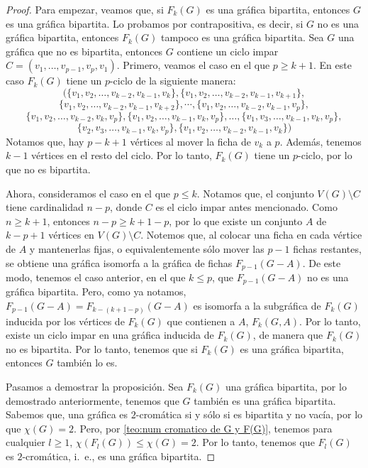 \begin{proof}
    Para empezar, veamos que, si $F_k(G)$ es una gr\'afica bipartita, entonces
    $G$ es una gr\'afica bipartita. Lo probamos por contrapositiva, es decir, si
    $G$ no es una gr\'afica bipartita, entonces $F_k(G)$ tampoco es una
    gr\'afica bipartita. Sea $G$ una gr\'afica que no es bipartita, entonces $G$
    contiene un ciclo impar $C=(v_1, \dots, v_{p-1}, v_p, v_1)$. Primero, veamos
    el caso en el que $p \geq k+1$. En este caso $F_k(G)$ tiene un $p$-ciclo de
    la siguiente manera: 
    \[
    (\{v_1, v_2, \dots, v_{k-2}, v_{k-1},v_k\},\{v_1, v_2, \dots, v_{k-2}, v_{k-1}, v_{k+1}\},\]
    \[\{v_1, v_2, \dots, v_{k-2}, v_{k-1}, v_{k+2}\},\cdots,\{v_1, v_2, \dots, v_{k-2}, v_{k-1},v_p\},\]
    \[\{v_1, v_2, \dots, v_{k-2}, v_k, v_p\},\{v_1, v_2, \dots, v_{k-1},v_k, v_p\},
    \dots,\{v_1, v_3, \dots, v_{k-1}, v_k, v_p\},\]
    \[\{v_2, v_3,\dots, v_{k-1}, v_k, v_p\},\{v_1, v_2, \dots, v_{k-2}, v_{k-1}, v_k\})
    \]
    Notamos que, hay $p-k+1$ v\'ertices al mover la ficha de $v_k$ a $p$.
    Adem\'as, tenemos $k-1$ v\'ertices en el resto del ciclo. Por lo tanto,
    $F_k(G)$ tiene un $p$-ciclo, por lo que no es bipartita.
    
    Ahora, consideramos el caso en el que $p \leq k$. Notamos que, el conjunto
    $V(G)\setminus C$ tiene cardinalidad $n-p$, donde $C$ es el ciclo impar
    antes mencionado. Como $n \geq k+1$, entonces $n-p \geq k+1-p$, por lo que
    existe un conjunto $A$ de $k-p+1$ v\'ertices en $V(G)\setminus C$. Notemos
    que, al colocar una ficha en cada v\'ertice de $A$ y mantenerlas fijas, o
    equivalentemente s\'olo mover las $p-1$ fichas restantes, se obtiene una
    gr\'afica isomorfa a la gr\'afica de fichas $F_{p-1}(G-A)$. De este modo,
    tenemos el caso anterior, en el que $k \leq p$, que $F_{p-1}(G-A)$ no es una
    gr\'afica bipartita. Pero, como ya notamos, $F_{p-1}(G-A) = F_{k-(k+1-p)}
    (G-A)$ es isomorfa a la subgr\'afica de $F_k(G)$ inducida por los v\'ertices
    de $F_k(G)$ que contienen a $A$, $F_k(G,A)$. Por lo tanto, existe un ciclo
    impar en una gr\'afica inducida de $F_k(G)$, de manera que $F_k(G)$ no es
    bipartita. Por lo tanto, tenemos que si $F_k(G)$ es una gr\'afica bipartita,
    entonces $G$ tambi\'en lo es.

    Pasamos a demostrar la proposici\'on. Sea $F_k(G)$ una gr\'afica bipartita,
    por lo demostrado anteriormente, tenemos que $G$ tambi\'en es una gr\'afica
    bipartita. Sabemos que, una gr\'afica es $2$-crom\'atica si y s\'olo si es
    bipartita y no vac\'ia, por lo que $\chi(G)=2$. Pero, por \cref{teo:num
    cromatico de G y F(G)}, tenemos para cualquier $l\geq 1$, $\chi (F_l(G)) \le
    \chi (G) = 2$. Por lo tanto, tenemos que $F_l(G)$ es $2$-crom\'atica, i.~e.,
    es una gr\'afica bipartita.
\end{proof}

